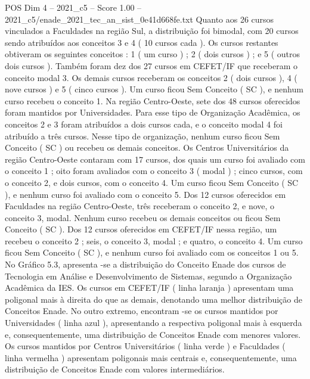 \begin{textsample}{POS Dim 4 – 2021\_c5 – Score 1.00 – 2021\_c5/enade\_2021\_tec\_an\_sist\_0e41d668fe.txt}
Quanto aos 26 cursos vinculados a Faculdades na região Sul, a distribuição foi bimodal, com 20 cursos sendo atribuídos aos conceitos 3 e 4 ( 10 cursos cada ).
Os cursos restantes obtiveram os seguintes conceitos : 1 ( um curso ) ; 2 ( dois cursos ) ; e 5 ( outros dois cursos ).
Também foram dez dos 27 cursos em CEFET/IF que receberam o conceito modal 3.
Os demais cursos receberam os conceitos 2 ( dois cursos ), 4 ( nove cursos ) e 5 ( cinco cursos ).
Um curso ficou Sem Conceito ( SC ), e nenhum curso recebeu o conceito 1.
Na região Centro-Oeste, sete dos 48 cursos oferecidos foram mantidos por Universidades.
Para esse tipo de Organização Acadêmica, os conceitos 2 e 3 foram atribuídos a dois cursos cada, e o conceito modal 4 foi atribuído a três cursos.
Nesse tipo de organização, nenhum curso ficou Sem Conceito ( SC ) ou recebeu os demais conceitos.
Os Centros Universitários da região Centro-Oeste contaram com 17 cursos, dos quais um curso foi avaliado com o conceito 1 ; oito foram avaliados com o conceito 3 ( modal ) ; cinco cursos, com o conceito 2, e dois cursos, com o conceito 4.
Um curso ficou Sem Conceito ( SC ), e nenhum curso foi avaliado com o conceito 5.
Dos 12 cursos oferecidos em Faculdades na região Centro-Oeste, três receberam o conceito 2, e nove, o conceito 3, modal.
Nenhum curso recebeu os demais conceitos ou ficou Sem Conceito ( SC ).
Dos 12 cursos oferecidos em CEFET/IF nessa região, um recebeu o conceito 2 ; seis, o conceito 3, modal ; e quatro, o conceito 4.
Um curso ficou Sem Conceito ( SC ), e nenhum curso foi avaliado com os conceitos 1 ou 5.
No Gráfico 5.3, apresenta -se a distribuição do Conceito Enade dos cursos de Tecnologia em Análise e Desenvolvimento de Sistemas, segundo a Organização Acadêmica da IES.
Os cursos em CEFET/IF ( linha laranja ) apresentam uma poligonal mais à direita do que as demais, denotando uma melhor distribuição de Conceitos Enade.
No outro extremo, encontram -se os cursos mantidos por Universidades ( linha azul ), apresentando a respectiva poligonal mais à esquerda e, consequentemente, uma distribuição de Conceitos Enade com menores valores.
Os cursos mantidos por Centros Universitários ( linha verde ) e Faculdades ( linha vermelha ) apresentam poligonais mais centrais e, consequentemente, uma distribuição de Conceitos Enade com valores intermediários.

\end{textsample}
